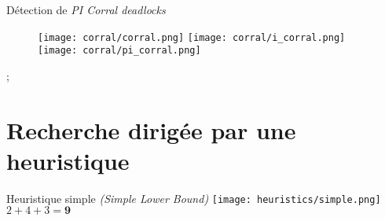             \begin{frame}{Détection de \textit{PI Corral deadlocks}}
                 {
                    \begin{minipage}{0.9\textwidth}
                        \begin{figure}
                            \centering
                             {
                                \texttt{[image: corral/corral.png]}%
                            }
                             {
                                \texttt{[image: corral/i\_corral.png]}%
                            }
                             {
                                \texttt{[image: corral/pi\_corral.png]}%
                            }
                        \end{figure}
                    \end{minipage}
                }
            \end{frame}

            \begin{interstateframe}
                \begin{interstatenv}{6}{4};\end{interstatenv}
            \end{interstateframe}

    \section{Recherche dirigée par une heuristique}
        \begin{frame}{Heuristique simple \textit{(Simple Lower Bound)}}
            \centering%
            \texttt{[image: heuristics/simple.png]}
            \Large$\boxed{2 + 4 + 3 = \mathbf{9}}$
        \end{frame}

